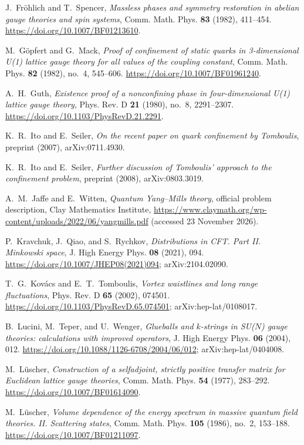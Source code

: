 J.~Fr\"ohlich and T.~Spencer, \emph{Massless phases and symmetry restoration in abelian gauge theories and spin systems},
Comm. Math. Phys. \textbf{83} (1982), 411--454.
\url{https://doi.org/10.1007/BF01213610}.

M.~G\"opfert and G.~Mack, \emph{Proof of confinement of static quarks in 3-dimensional U(1) lattice gauge theory for all values of the coupling constant},
Comm. Math. Phys. \textbf{82} (1982), no.~4, 545--606.
\url{https://doi.org/10.1007/BF01961240}.

A.~H.~Guth, \emph{Existence proof of a nonconfining phase in four-dimensional U(1) lattice gauge theory},
Phys. Rev. D \textbf{21} (1980), no.~8, 2291--2307.
\url{https://doi.org/10.1103/PhysRevD.21.2291}.

K.~R.~Ito and E.~Seiler, \emph{On the recent paper on quark confinement by Tomboulis},
preprint (2007), arXiv:0711.4930.

K.~R.~Ito and E.~Seiler, \emph{Further discussion of Tomboulis' approach to the confinement problem},
preprint (2008), arXiv:0803.3019.

A.~M.~Jaffe and E.~Witten, \emph{Quantum Yang--Mills theory}, official problem description,
Clay Mathematics Institute, \url{https://www.claymath.org/wp-content/uploads/2022/06/yangmills.pdf}
(accessed 23 November 2026).

P.~Kravchuk, J.~Qiao, and S.~Rychkov, \emph{Distributions in CFT. Part II. Minkowski space},
J. High Energy Phys. \textbf{08} (2021), 094.
\url{https://doi.org/10.1007/JHEP08(2021)094}; arXiv:2104.02090.

T.~G.~Kov\'acs and E.~T.~Tomboulis, \emph{Vortex waistlines and long range fluctuations},
Phys. Rev. D \textbf{65} (2002), 074501.
\url{https://doi.org/10.1103/PhysRevD.65.074501}; arXiv:hep-lat/0108017.

B.~Lucini, M.~Teper, and U.~Wenger, \emph{Glueballs and $k$-strings in SU($N$) gauge theories: calculations with improved operators},
J. High Energy Phys. \textbf{06} (2004), 012.
\url{https://doi.org/10.1088/1126-6708/2004/06/012}; arXiv:hep-lat/0404008.

M.~L\"uscher, \emph{Construction of a selfadjoint, strictly positive transfer matrix for Euclidean lattice gauge theories},
Comm. Math. Phys. \textbf{54} (1977), 283--292.
\url{https://doi.org/10.1007/BF01614090}.

M.~L\"uscher, \emph{Volume dependence of the energy spectrum in massive quantum field theories. II. Scattering states},
Comm. Math. Phys. \textbf{105} (1986), no.~2, 153--188.
\url{https://doi.org/10.1007/BF01211097}.

